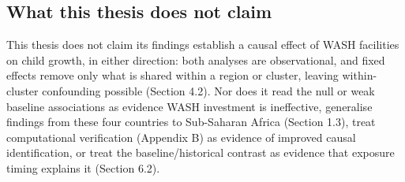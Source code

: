 \subsection{What this thesis does not claim}\label{sec:6.6}

This thesis does not claim its findings establish a causal effect of WASH facilities on child growth, in either direction: both analyses are observational, and fixed effects remove only what is shared within a region or cluster, leaving within-cluster confounding possible (Section 4.2). Nor does it read the null or weak baseline associations as evidence WASH investment is ineffective, generalise findings from these four countries to Sub-Saharan Africa (Section 1.3), treat computational verification (Appendix B) as evidence of improved causal identification, or treat the baseline/historical contrast as evidence that exposure timing explains it (Section 6.2).
